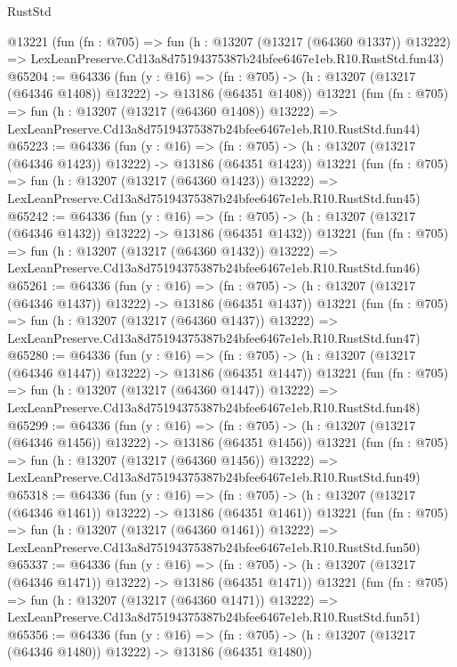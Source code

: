 \begin{lexlean}{RustStd}
\begin{coremodule}
    @13221
    (fun (fn : @705) =>
    fun (h : @13207 (@13217 (@64360 @1337)) @13222) =>
    LexLeanPreserve.Cd13a8d75194375387b24bfee6467e1eb.R10.RustStd.fun43)
@65204 := @64336
    (fun (y : @16) =>
    (fn : @705) -> (h : @13207 (@13217 (@64346 @1408)) @13222) -> @13186 (@64351 @1408))
    @13221
    (fun (fn : @705) =>
    fun (h : @13207 (@13217 (@64360 @1408)) @13222) =>
    LexLeanPreserve.Cd13a8d75194375387b24bfee6467e1eb.R10.RustStd.fun44)
@65223 := @64336
    (fun (y : @16) =>
    (fn : @705) -> (h : @13207 (@13217 (@64346 @1423)) @13222) -> @13186 (@64351 @1423))
    @13221
    (fun (fn : @705) =>
    fun (h : @13207 (@13217 (@64360 @1423)) @13222) =>
    LexLeanPreserve.Cd13a8d75194375387b24bfee6467e1eb.R10.RustStd.fun45)
@65242 := @64336
    (fun (y : @16) =>
    (fn : @705) -> (h : @13207 (@13217 (@64346 @1432)) @13222) -> @13186 (@64351 @1432))
    @13221
    (fun (fn : @705) =>
    fun (h : @13207 (@13217 (@64360 @1432)) @13222) =>
    LexLeanPreserve.Cd13a8d75194375387b24bfee6467e1eb.R10.RustStd.fun46)
@65261 := @64336
    (fun (y : @16) =>
    (fn : @705) -> (h : @13207 (@13217 (@64346 @1437)) @13222) -> @13186 (@64351 @1437))
    @13221
    (fun (fn : @705) =>
    fun (h : @13207 (@13217 (@64360 @1437)) @13222) =>
    LexLeanPreserve.Cd13a8d75194375387b24bfee6467e1eb.R10.RustStd.fun47)
@65280 := @64336
    (fun (y : @16) =>
    (fn : @705) -> (h : @13207 (@13217 (@64346 @1447)) @13222) -> @13186 (@64351 @1447))
    @13221
    (fun (fn : @705) =>
    fun (h : @13207 (@13217 (@64360 @1447)) @13222) =>
    LexLeanPreserve.Cd13a8d75194375387b24bfee6467e1eb.R10.RustStd.fun48)
@65299 := @64336
    (fun (y : @16) =>
    (fn : @705) -> (h : @13207 (@13217 (@64346 @1456)) @13222) -> @13186 (@64351 @1456))
    @13221
    (fun (fn : @705) =>
    fun (h : @13207 (@13217 (@64360 @1456)) @13222) =>
    LexLeanPreserve.Cd13a8d75194375387b24bfee6467e1eb.R10.RustStd.fun49)
@65318 := @64336
    (fun (y : @16) =>
    (fn : @705) -> (h : @13207 (@13217 (@64346 @1461)) @13222) -> @13186 (@64351 @1461))
    @13221
    (fun (fn : @705) =>
    fun (h : @13207 (@13217 (@64360 @1461)) @13222) =>
    LexLeanPreserve.Cd13a8d75194375387b24bfee6467e1eb.R10.RustStd.fun50)
@65337 := @64336
    (fun (y : @16) =>
    (fn : @705) -> (h : @13207 (@13217 (@64346 @1471)) @13222) -> @13186 (@64351 @1471))
    @13221
    (fun (fn : @705) =>
    fun (h : @13207 (@13217 (@64360 @1471)) @13222) =>
    LexLeanPreserve.Cd13a8d75194375387b24bfee6467e1eb.R10.RustStd.fun51)
@65356 := @64336
    (fun (y : @16) =>
    (fn : @705) -> (h : @13207 (@13217 (@64346 @1480)) @13222) -> @13186 (@64351 @1480))

\end{coremodule}
\end{lexlean}
